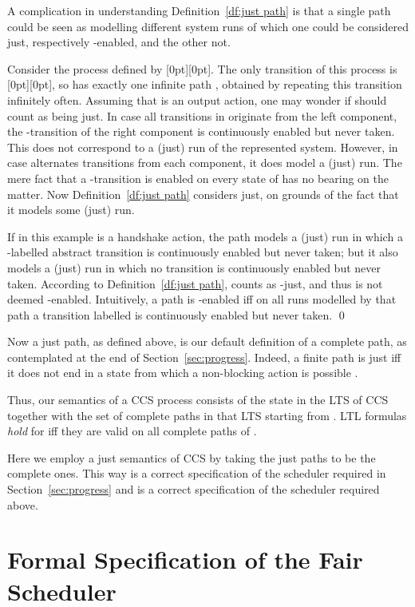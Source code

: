 \documentclass[smallcondensed]{svjour3}
\newcommand{\plat}[1]{\raisebox{0pt}[0pt][0pt]{#1}}  \def\precond#1{{\vphantom{#1}}^\bullet #1}
\newcommand{\Def}[1]{Definition~\ref{df:#1}}
\newcommand{\Sect}[1]{Section~\ref{sec:#1}}
\begin{document}
A complication in understanding \Def{just path} is that a single path could be seen as
modelling different system runs of which one could be considered just, respectively -enabled, and the other not.
\begin{example}\label{ex:not unique}
Consider the process  defined by \plat{}.
The only transition of this process is \plat{}, so  has exactly one infinite path ,
obtained by repeating this transition infinitely often. Assuming that  is an output action, one
may wonder if  should count as being just. In case all transitions in  originate
from the left component, the -transition of the right component is continuously enabled but
never taken. This does not correspond to a (just) run of the represented system.
However, in case  alternates transitions from each component, it does model a (just) run.
The mere fact that a -transition is enabled on every state of 
has no bearing on the matter. Now \Def{just path} considers  just, on grounds of the fact that
it models some (just) run.

If in this example  is a handshake action, the path  models a (just) run in which a
-labelled abstract transition is continuously enabled but never taken; but it also models a
(just) run in which no transition is continuously enabled but never taken.
According to \Def{just path},  counts as -just, and thus is not deemed -enabled.
Intuitively, a path is -enabled iff on all runs modelled by that path a transition labelled 
is continuously enabled but never taken.
\qed
\end{example}

Now a just path, as defined above, is our default definition of a complete path, as contemplated at
the end of \Sect{progress}. Indeed, a finite path is just iff it does not
end in a state from which a non-blocking action is possible \cite{GH14}.

Thus, our semantics of a CCS process  consists of the state  in the LTS of
CCS together with the set of complete paths in that LTS starting from  \cite{TR13,GH14}.
LTL formulas \emph{hold} for  iff they are valid on all complete paths of .

Here we employ a just semantics of CCS by taking the just paths to be the complete ones.
This way  is a correct specification of the scheduler required in \Sect{progress} and 
is a correct specification of the scheduler required above. 

\section{Formal Specification of the Fair Scheduler}\label{sec:fair spec}
 
\end{document}

